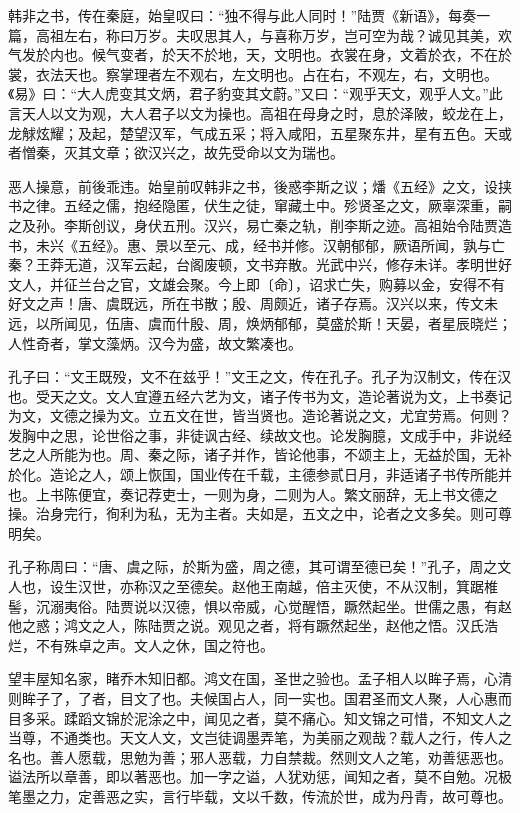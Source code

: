 \documentclass[]{article}
\begin{document}
韩非之书，传在秦庭，始皇叹曰：``独不得与此人同时！''陆贾《新语》，每奏一篇，高祖左右，称曰万岁。夫叹思其人，与喜称万岁，岂可空为哉？诚见其美，欢气发於内也。候气变者，於天不於地，天，文明也。衣裳在身，文着於衣，不在於裳，衣法天也。察掌理者左不观右，左文明也。占在右，不观左，右，文明也。《易》曰：``大人虎变其文炳，君子豹变其文蔚。''又曰：``观乎天文，观乎人文。''此言天人以文为观，大人君子以文为操也。高祖在母身之时，息於泽陂，蛟龙在上，龙觩炫耀；及起，楚望汉军，气成五采；将入咸阳，五星聚东井，星有五色。天或者憎秦，灭其文章；欲汉兴之，故先受命以文为瑞也。

恶人操意，前後乖违。始皇前叹韩非之书，後惑李斯之议；燔《五经》之文，设挟书之律。五经之儒，抱经隐匿，伏生之徒，窜藏土中。殄贤圣之文，厥辜深重，嗣之及孙。李斯创议，身伏五刑。汉兴，易亡秦之轨，削李斯之迹。高祖始令陆贾造书，未兴《五经》。惠、景以至元、成，经书并修。汉朝郁郁，厥语所闻，孰与亡秦？王莽无道，汉军云起，台阁废顿，文书弃散。光武中兴，修存未详。孝明世好文人，并征兰台之官，文雄会聚。今上即〔命〕，诏求亡失，购募以金，安得不有好文之声！唐、虞既远，所在书散；殷、周颇近，诸子存焉。汉兴以来，传文未远，以所闻见，伍唐、虞而什殷、周，焕炳郁郁，莫盛於斯！天晏，者星辰晓烂；人性奇者，掌文藻炳。汉今为盛，故文繁凑也。

孔子曰：``文王既殁，文不在兹乎！''文王之文，传在孔子。孔子为汉制文，传在汉也。受天之文。文人宜遵五经六艺为文，诸子传书为文，造论著说为文，上书奏记为文，文德之操为文。立五文在世，皆当贤也。造论著说之文，尤宜劳焉。何则？发胸中之思，论世俗之事，非徒讽古经、续故文也。论发胸臆，文成手中，非说经艺之人所能为也。周、秦之际，诸子并作，皆论他事，不颂主上，无益於国，无补於化。造论之人，颂上恢国，国业传在千载，主德参贰日月，非适诸子书传所能并也。上书陈便宜，奏记荐吏士，一则为身，二则为人。繁文丽辞，无上书文德之操。治身完行，徇利为私，无为主者。夫如是，五文之中，论者之文多矣。则可尊明矣。

孔子称周曰：``唐、虞之际，於斯为盛，周之德，其可谓至德已矣！''孔子，周之文人也，设生汉世，亦称汉之至德矣。赵他王南越，倍主灭使，不从汉制，箕踞椎髻，沉溺夷俗。陆贾说以汉德，惧以帝威，心觉醒悟，蹶然起坐。世儒之愚，有赵他之惑；鸿文之人，陈陆贾之说。观见之者，将有蹶然起坐，赵他之悟。汉氏浩烂，不有殊卓之声。文人之休，国之符也。

望丰屋知名家，睹乔木知旧都。鸿文在国，圣世之验也。孟子相人以眸子焉，心清则眸子了，了者，目文了也。夫候国占人，同一实也。国君圣而文人聚，人心惠而目多采。蹂蹈文锦於泥涂之中，闻见之者，莫不痛心。知文锦之可惜，不知文人之当尊，不通类也。天文人文，文岂徒调墨弄笔，为美丽之观哉？载人之行，传人之名也。善人愿载，思勉为善；邪人恶载，力自禁裁。然则文人之笔，劝善惩恶也。谥法所以章善，即以著恶也。加一字之谥，人犹劝惩，闻知之者，莫不自勉。况极笔墨之力，定善恶之实，言行毕载，文以千数，传流於世，成为丹青，故可尊也。
\end{document}
